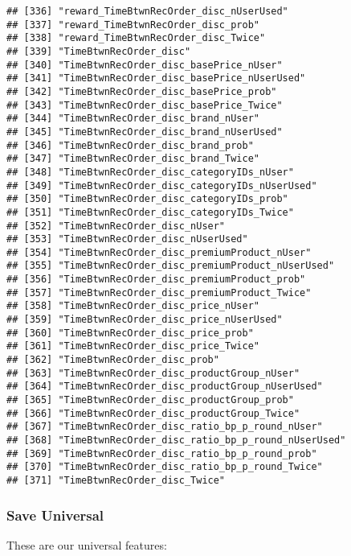 \documentclass[10pt]{report}
\begin{document}
\begin{verbatim}
## [336] "reward_TimeBtwnRecOrder_disc_nUserUsed"             
## [337] "reward_TimeBtwnRecOrder_disc_prob"                  
## [338] "reward_TimeBtwnRecOrder_disc_Twice"                 
## [339] "TimeBtwnRecOrder_disc"                              
## [340] "TimeBtwnRecOrder_disc_basePrice_nUser"              
## [341] "TimeBtwnRecOrder_disc_basePrice_nUserUsed"          
## [342] "TimeBtwnRecOrder_disc_basePrice_prob"               
## [343] "TimeBtwnRecOrder_disc_basePrice_Twice"              
## [344] "TimeBtwnRecOrder_disc_brand_nUser"                  
## [345] "TimeBtwnRecOrder_disc_brand_nUserUsed"              
## [346] "TimeBtwnRecOrder_disc_brand_prob"                   
## [347] "TimeBtwnRecOrder_disc_brand_Twice"                  
## [348] "TimeBtwnRecOrder_disc_categoryIDs_nUser"            
## [349] "TimeBtwnRecOrder_disc_categoryIDs_nUserUsed"        
## [350] "TimeBtwnRecOrder_disc_categoryIDs_prob"             
## [351] "TimeBtwnRecOrder_disc_categoryIDs_Twice"            
## [352] "TimeBtwnRecOrder_disc_nUser"                        
## [353] "TimeBtwnRecOrder_disc_nUserUsed"                    
## [354] "TimeBtwnRecOrder_disc_premiumProduct_nUser"         
## [355] "TimeBtwnRecOrder_disc_premiumProduct_nUserUsed"     
## [356] "TimeBtwnRecOrder_disc_premiumProduct_prob"          
## [357] "TimeBtwnRecOrder_disc_premiumProduct_Twice"         
## [358] "TimeBtwnRecOrder_disc_price_nUser"                  
## [359] "TimeBtwnRecOrder_disc_price_nUserUsed"              
## [360] "TimeBtwnRecOrder_disc_price_prob"                   
## [361] "TimeBtwnRecOrder_disc_price_Twice"                  
## [362] "TimeBtwnRecOrder_disc_prob"                         
## [363] "TimeBtwnRecOrder_disc_productGroup_nUser"           
## [364] "TimeBtwnRecOrder_disc_productGroup_nUserUsed"       
## [365] "TimeBtwnRecOrder_disc_productGroup_prob"            
## [366] "TimeBtwnRecOrder_disc_productGroup_Twice"           
## [367] "TimeBtwnRecOrder_disc_ratio_bp_p_round_nUser"       
## [368] "TimeBtwnRecOrder_disc_ratio_bp_p_round_nUserUsed"   
## [369] "TimeBtwnRecOrder_disc_ratio_bp_p_round_prob"        
## [370] "TimeBtwnRecOrder_disc_ratio_bp_p_round_Twice"       
## [371] "TimeBtwnRecOrder_disc_Twice"
\end{verbatim}

\subsubsection{Save Universal}\label{save-universal-1}

These are our universal features:
\end{document}

